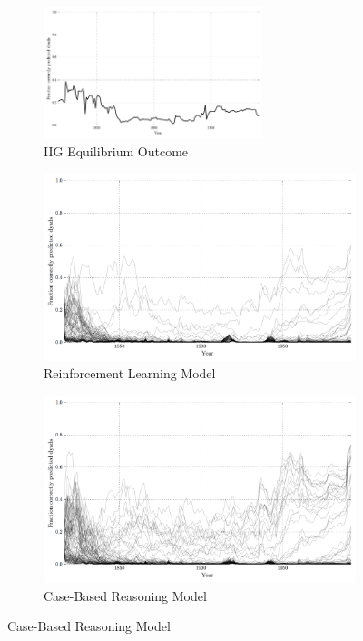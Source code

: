 \begin{landscape}

	\begin{figure}[h!]
	    \centering
		\begin{subfigure}[t]{\textwidth}
	        \includegraphics[width=0.7\textwidth]{WarReason/Figures/EQ_correct}
	        \caption{IIG Equilibrium Outcome}
	        \label{fig:eq_correct}
	    \end{subfigure}

	    \begin{subfigure}[t]{0.7\textwidth}
	        \includegraphics[width=\textwidth]{WarReason/Figures/RL_correct}
	        \caption{Reinforcement Learning Model}
	    \end{subfigure}
	    \begin{subfigure}[t]{0.7\textwidth}
	        \includegraphics[width=\textwidth]{WarReason/Figures/CB_correct}
	        \caption{Case-Based Reasoning Model}
	    \end{subfigure}


\end{figure}
\end{landscape}
